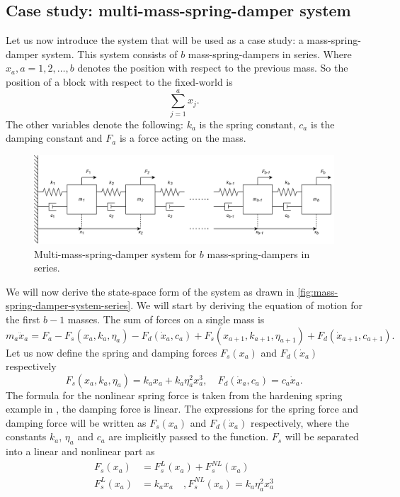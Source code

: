 \subsection{Case study: multi-mass-spring-damper system}
Let us now introduce the system that will be used as a case study: a mass-spring-damper system. This system consists of $b$ mass-spring-dampers in series. Where $x_a,a=1,2,\dots,b$ denotes the position with respect to the previous mass. So the position of a block with respect to the fixed-world is
\begin{equation}\label{eqn:mass-position-wrt-fixed-world}
    \sum^{a}_{j=1}x_j.
\end{equation}
The other variables denote the following: $k_a$ is the spring constant, $c_a$ is the damping constant and $F_a$ is a force acting on the mass.
\begin{figure}[h]
    \centering
    \includegraphics[width=0.9\linewidth]{report/Figures/Mass-spring-damper system.png}
    \caption{Multi-mass-spring-damper system for $b$ mass-spring-dampers in series.}
    \label{fig:mass-spring-damper-system-series}
\end{figure}

We will now derive the state-space form of the system as drawn in \autoref{fig:mass-spring-damper-system-series}. We will start by deriving the equation of motion for the first $b-1$ masses. The sum of forces on a single mass is
\begin{equation}\label{eqn:free-body-equation}
    m_a\ddot{x}_a = F_a - F_s(x_a,k_a,\eta_a) - F_d(\dot{x}_a,c_a) + F_s(x_{a+1},k_{a+1},\eta_{a+1}) + F_d(\dot{x}_{a+1},c_{a+1}).
\end{equation}
Let us now define the spring and damping forces $F_s(x_a)$ and $F_d(\dot{x}_a)$ respectively
\begin{equation*}
    F_s(x_a,k_a,\eta_a) = k_ax_a + k_a \eta_a^2 x_a^3, \quad F_d(\dot{x}_a,c_a) = c_a\dot{x}_a.
\end{equation*}
The formula for the nonlinear spring force is taken from the hardening spring example in \cite[Section 1.2.3]{Khalil2002NonlinearSystems}, the damping force is linear. The expressions for the spring force and damping force will be written as $F_s(x_a)$ and $F_d(\dot{x}_a)$ respectively, where the constants $k_a$, $\eta_a$ and $c_a$ are implicitly passed to the function. $F_s$ will be separated into a linear and nonlinear part as
\begin{equation}\label{eqn:nonlinear-spring}
    \begin{split}
        F_s(x_a) &= F_s^L(x_a) + F_s^{NL}(x_a) \\
        F_s^L(x_a) &= k_ax_a \quad , F_s^{NL}(x_a) = k_a\eta_a^2x^3_a
    \end{split}    
\end{equation}

